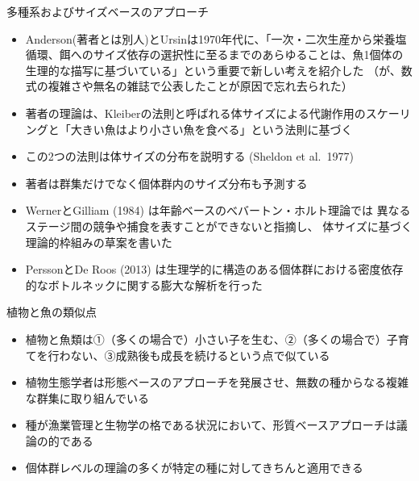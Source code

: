 \documentclass[
  ignorenonframetext,
]{beamer}
\providecommand{\tightlist}{%
  \setlength{\itemsep}{0pt}\setlength{\parskip}{0pt}}
\begin{document}
\begin{frame}{多種系およびサイズベースのアプローチ}
\protect\hypertarget{ux591aux7a2eux7cfbux304aux3088ux3073ux30b5ux30a4ux30baux30d9ux30fcux30b9ux306eux30a2ux30d7ux30edux30fcux30c1}{}

\begin{itemize}
\tightlist
\item
  Anderson(著者とは別人)とUrsinは1970年代に、「一次・二次生産から栄養塩循環、餌へのサイズ依存の選択性に至るまでのあらゆることは、魚1個体の生理的な描写に基づいている」という重要で新しい考えを紹介した
  （が、数式の複雑さや無名の雑誌で公表したことが原因で忘れ去られた）\\
\item
  著者の理論は、Kleiberの法則と呼ばれる体サイズによる代謝作用のスケーリングと「大きい魚はより小さい魚を食べる」という法則に基づく
\item
  この2つの法則は体サイズの分布を説明する (Sheldon et al.~1977) 
\item
  著者は群集だけでなく個体群内のサイズ分布も予測する 
\item
  WernerとGilliam (1984) は年齢ベースのべバートン・ホルト理論では
  異なるステージ間の競争や捕食を表すことができないと指摘し、
  体サイズに基づく理論的枠組みの草案を書いた\\
\item
  PerssonとDe Roos (2013)
  は生理学的に構造のある個体群における密度依存的なボトルネックに関する膨大な解析を行った
\end{itemize}

\end{frame}

\begin{frame}{植物と魚の類似点}
\protect\hypertarget{ux690dux7269ux3068ux9b5aux306eux985eux4f3cux70b9}{}

\begin{itemize}
\tightlist
\item
  植物と魚類は①（多くの場合で）小さい子を生む、②（多くの場合で）子育てを行わない、③成熟後も成長を続けるという点で似ている\\
  \vspace{6mm}
\item
  植物生態学者は形態ベースのアプローチを発展させ、無数の種からなる複雑な群集に取り組んでいる\\
  \vspace{6mm}
\item
  種が漁業管理と生物学の格である状況において、形質ベースアプローチは議論の的である
  \vspace{6mm}
\item
  個体群レベルの理論の多くが特定の種に対してきちんと適用できる
\end{itemize}

\end{frame}
\end{document}
